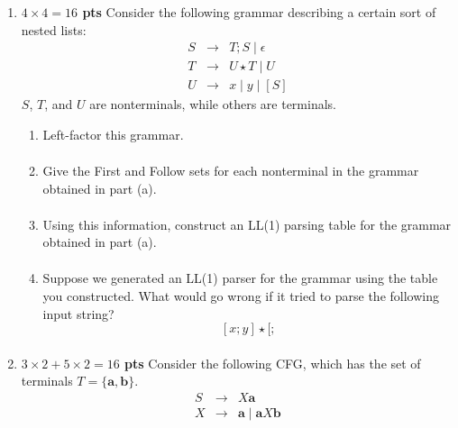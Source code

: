 \documentclass[10pt]{article}
\newcommand {\pts}[1]{{\bf #1 pts}}
\begin{document}
\begin{enumerate}
\newpage
\item \pts{$4\times 4 =16$} Consider the following grammar describing a certain sort of nested lists:
\[\begin{array}{cll}
S & \rightarrow & T;S \mid \epsilon \\
T & \rightarrow & U\star T \mid U \\
U & \rightarrow & x\mid y\mid [S]
\end{array}\]
$S$, $T$, and $U$ are nonterminals, while others are terminals.
\begin{enumerate}
  \item Left-factor this grammar.
            \begin{equation*}\begin{aligned}
            \end{aligned}\end{equation*}
  \item Give the First and Follow sets for each nonterminal in the grammar obtained in part (a).
            \begin{equation*}\begin{aligned}
            \end{aligned}\end{equation*}
  \item Using this information, construct an LL(1) parsing table for the grammar obtained in part (a).
            \begin{equation*}\begin{aligned}
            \end{aligned}\end{equation*}
  \item Suppose we generated an LL(1) parser for the grammar using the table you constructed. What would go wrong if it tried to parse the following input string?
  \[[x;y]\star [;\]
            \begin{equation*}\begin{aligned}
            \end{aligned}\end{equation*}
\end{enumerate}

\newpage
\item \pts{$3\times 2+5\times 2 =16$} Consider the following CFG, which has the set of terminals
$T = \{ \textbf{a}, \textbf{b} \}$.
\[\begin{array}{cll}
 S & \rightarrow & X \textbf{a} \\
X & \rightarrow & \textbf{a} \mid \textbf{a} X \textbf{b}
\end{array}\]


\end{enumerate}
\end{document}
